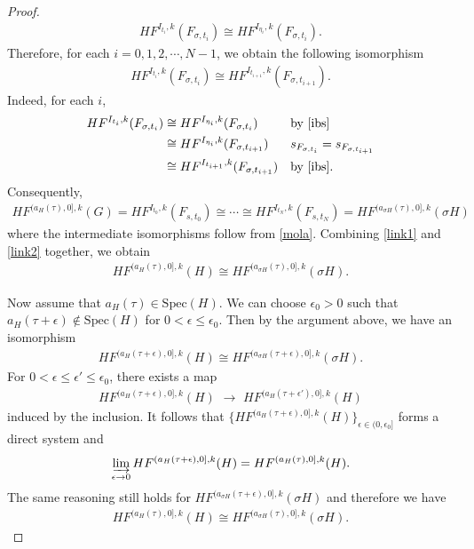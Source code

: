 \documentclass[12pt]{amsart}
\theoremstyle{definition}
\newcommand{\lr}{{\,\,\longrightarrow\,\,}}
\begin{document}
\begin{proof}
\begin{align}\label{ibs}
    HF^{I_{t_i},k}(F_{\sigma,t_i}) \cong HF^{I_{\eta_i},k}(F_{\sigma,t_i}).
\end{align}
Therefore, for each $i = 0,1,2, \cdots, N-1$, we obtain the following isomorphism
\begin{align}\label{mola}
    HF^{I_{t_i},k}(F_{\sigma,t_i}) \cong HF^{I_{t_{i+1}},k} (F_{\sigma,t_{i+1}}).
\end{align}
Indeed, for each $i$,
\begin{align*}
    HF^{I_{t_i},k}(F_{\sigma,t_i}) &\cong HF^{I_{\eta_i},k} (F_{\sigma,t_i}) &&\textrm{by}\,\,\eqref{ibs}\\
    &\cong HF^{I_{\eta_i},k} (F_{\sigma,t_{i+1}})&&s_{F_{\sigma,t_i}} = s_{F_{\sigma,t_{i+1}}}\\
    &\cong HF^{I_{t_{i+1}},k} (F_{\sigma,t_{i+1}}) &&\textrm{by}\,\,\eqref{ibs}.
\end{align*}
Consequently, 
\begin{align}\label{link2}
    HF^{(a_H(\tau),0],k}(G) = HF^{I_{t_0},k}(F_{s,t_0})\cong \cdots \cong HF^{I_{t_N},k}(F_{s,t_N}) = HF^{(a_{\sigma H}(\tau),0],k}(\sigma H)
\end{align}
where the intermediate isomorphisms follow from \eqref{mola}. Combining \eqref{link1} and \eqref{link2} together, we obtain
\begin{align*}
     HF^{(a_H(\tau),0],k}(H) \cong HF^{(a_{\sigma H}(\tau),0],k}(\sigma H). 
\end{align*}

\vspace{0.2 cm}

Now assume that $a_H(\tau) \in \textrm{Spec}(H)$. We can choose $\epsilon_0 >0$ such that $a_H(\tau+\epsilon ) \notin \textrm{Spec}(H)$ for $0< \epsilon \leq \epsilon_0$. Then by the argument above, we have an isomorphism
\begin{align*}
    HF^{(a_H(\tau +\epsilon), 0],k}(H) \cong HF^{(a_{\sigma H}(\tau +\epsilon),0],k}(\sigma H).
\end{align*}
For $0< \epsilon \leq \epsilon' \leq \epsilon_0$, there exists a map 
\begin{align*}
    HF^{(a_H(\tau+\epsilon ),0],k}(H) \lr HF^{(a_H(\tau+\epsilon' ),0],k}(H)
\end{align*}
induced by the inclusion. It follows that $\{ HF^{(a_H(\tau+\epsilon ), 0],k}(H)  \}_{\epsilon \in (0, \epsilon_0]}$ forms a direct system and 
\begin{align*}
    \varinjlim_{\epsilon \to 0} HF^{(a_H(\tau+\epsilon ), 0],k}(H) = HF^{(a_H(\tau),0],k}(H). 
\end{align*}
The same reasoning still holds for $HF^{(a_{\sigma H}(\tau +\epsilon), 0],k}(\sigma H)$ and therefore we have
\begin{align*}
    HF^{(a_H(\tau),0],k}(H) \cong HF^{(a_{\sigma H}(\tau),0],k}(\sigma H).
\end{align*} 


\end{proof}
\end{document}
